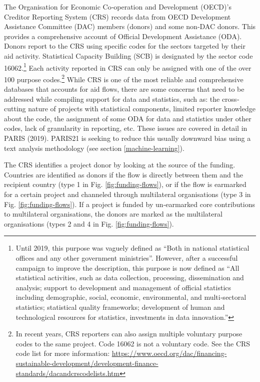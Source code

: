 \documentclass[
]{article}
\begin{document}
The Organisation for Economic Co‐operation and Development (OECD)'s Creditor Reporting System
(CRS) records data from OECD Development Assistance Committee (DAC) members (donors) and some
non‐DAC donors. This provides a comprehensive account of Official Development Assistance (ODA).
Donors report to the CRS using specific codes for the sectors targeted by their aid activity. Statistical
Capacity Building (SCB) is designated by the sector code 16062.\footnote{Until 2019, this purpose was vaguely defined as ``Both in national statistical offices and any other government ministries''. However, after a successful campaign to improve the description, this purpose is now defined as ``All statistical activities, such as data collection, processing, dissemination and analysis; support to development and management of official statistics
  including demographic, social, economic, environmental, and multi‐sectoral statistics; statistical quality frameworks;
  development of human and technological resources for statistics, investments in data innovation.''}
Each activity reported in CRS can only be assigned with one of the over 100 purpose codes.\footnote{In recent years, CRS reporters can also assign multiple voluntary purpose codes to the same project. Code 16062 is not a voluntary code. See the CRS code list for more information: \url{https://www.oecd.org/dac/financing-sustainable-development/development-finance-standards/dacandcrscodelists.htm}}
While CRS is one of the most reliable and comprehensive databases that accounts for aid flows, there are some concerns that need to be
addressed while compiling support for data and statistics, such as: the cross‐cutting nature of projects
with statistical components, limited reporter knowledge about the code, the assignment of some ODA
for data and statistics under other codes, lack of granularity in reporting, etc. These issues are covered
in detail in PARIS (2019). PARIS21 is seeking to reduce this usually downward bias using a text analysis
methodology (see section \ref{machine-learning}).

The CRS identifies a project donor by looking at the source of the funding. Countries are identified as
donors if the flow is directly between them and the recipient country (type 1 in Fig. \ref{fig:funding-flows}), or if
the flow is earmarked for a certain project and channeled through multilateral organisations (type 3
in Fig. \ref{fig:funding-flows}). If a project is funded by un‐earmarked core contributions to multilateral
organisations, the donors are marked as the multilateral organisations (types 2 and 4 in Fig. \ref{fig:funding-flows}).
\end{document}
